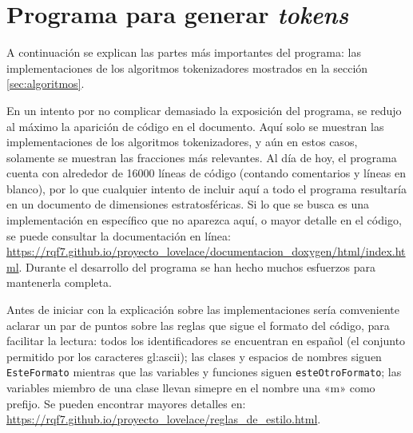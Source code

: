 %
%
%

\section{Programa para generar \textit{tokens}}

A continuación se explican las partes más importantes del programa:
las implementaciones de los algoritmos tokenizadores mostrados en la
sección \ref{sec:algoritmos}.

En un intento por no complicar demasiado la exposición del programa, se  redujo
al máximo la aparición de código en el documento. Aquí solo se muestran las
implementaciones de los algoritmos tokenizadores, y aún en estos casos,
solamente se muestran las fracciones más relevantes. Al día de hoy, el programa
cuenta con alrededor de 16000 líneas de código (contando comentarios y líneas
en blanco), por lo que cualquier intento de incluir aquí a todo el programa
resultaría en un documento de dimensiones estratosféricas. Si lo que se busca
es una implementación en específico que no aparezca aquí, o mayor detalle en el
código, se puede consultar la documentación en línea:
\url{https://rqf7.github.io/proyecto_lovelace/documentacion_doxygen/html/index.html}.
Durante el desarrollo del programa se han hecho muchos esfuerzos para
mantenerla completa.

Antes de iniciar con la explicación sobre las implementaciones sería
comveniente aclarar un par de puntos sobre las reglas que sigue el formato del
código, para facilitar la lectura: todos los identificadores se encuentran en
español (el conjunto permitido por los caracteres \gls{gl:ascii}); las clases y
espacios de nombres siguen \texttt{EsteFormato} mientras que las variables y
funciones siguen \texttt{esteOtroFormato}; las variables miembro de una clase
llevan simepre en el nombre una «m» como prefijo. Se pueden encontrar mayores
detalles en:
\url{https://rqf7.github.io/proyecto_lovelace/reglas_de_estilo.html}.

